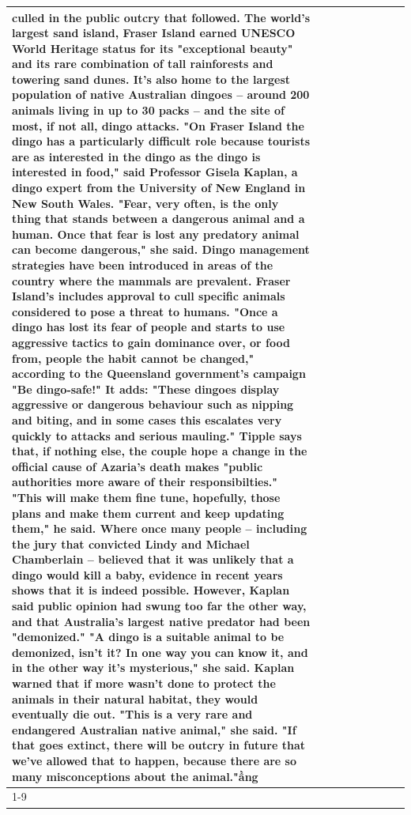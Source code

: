 \begin{table}[H]
\begin{tabular}{lllrlllll}
culled in the public outcry that followed. The world's largest sand island, Fraser Island earned UNESCO World Heritage status for its "exceptional beauty" and its rare combination of tall rainforests and towering sand dunes. It's also home to the largest population of native Australian dingoes -- around 200 animals living in up to 30 packs -- and the site of most, if not all, dingo attacks. "On Fraser Island the dingo has a particularly difficult role because tourists are as interested in the dingo as the dingo is interested in food," said Professor Gisela Kaplan, a dingo expert from the University of New England in New South Wales. "Fear, very often, is the only thing that stands between a dangerous animal and a human. Once that fear is lost any predatory animal can become dangerous," she said. Dingo management strategies have been introduced in areas of the country where the mammals are prevalent. Fraser Island's includes approval to cull specific animals considered to pose a threat to humans. "Once a dingo has lost its fear of people and starts to use aggressive tactics to gain dominance over, or food from, people the habit cannot be changed," according to the Queensland government's campaign "Be dingo-safe!" It adds: "These dingoes display aggressive or dangerous behaviour such as nipping and biting, and in some cases this escalates very quickly to attacks and serious mauling." Tipple says that, if nothing else, the couple hope a change in the official cause of Azaria's death makes "public authorities more aware of their responsibilties." "This will make them fine tune, hopefully, those plans and make them current and keep updating them," he said. Where once many people -- including the jury that convicted Lindy and Michael Chamberlain -- believed that it was unlikely that a dingo would kill a baby, evidence in recent years shows that it is indeed possible. However, Kaplan said public opinion had swung too far the other way, and that Australia's largest native predator had been "demonized." "A dingo is a suitable animal to be demonized, isn't it? In one way you can know it, and in the other way it's mysterious," she said. Kaplan warned that if more wasn't done to protect the animals in their natural habitat, they would eventually die out. "This is a very rare and endangered Australian native animal," she said. "If that goes extinct, there will be outcry in future that we've allowed that to happen, because there are so many misconceptions about the animal."ầng \\
\cline{1-9}

\end{tabular}
\end{table}
